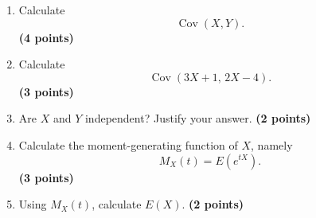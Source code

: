 \documentclass[11pt]{article}
\begin{document}
\begin{enumerate}[label=(\alph*),leftmargin=*,itemsep=0.8em]

    \item Calculate
    \[
    \operatorname{Cov}(X,Y).
    \]
    \hfill \textbf{(4 points)}

    \item Calculate
    \[
    \operatorname{Cov}(3X+1,\,2X-4).
    \]
    \hfill \textbf{(3 points)}

    \item Are \(X\) and \(Y\) independent? Justify your answer.
    \hfill \textbf{(2 points)}

    \item Calculate the moment-generating function of \(X\), namely
    \[
    M_X(t)=E(e^{tX}).
    \]
    \hfill \textbf{(3 points)}

    \item Using \(M_X(t)\), calculate \(E(X)\).
    \hfill \textbf{(2 points)}
 

\end{enumerate}
\end{document}
